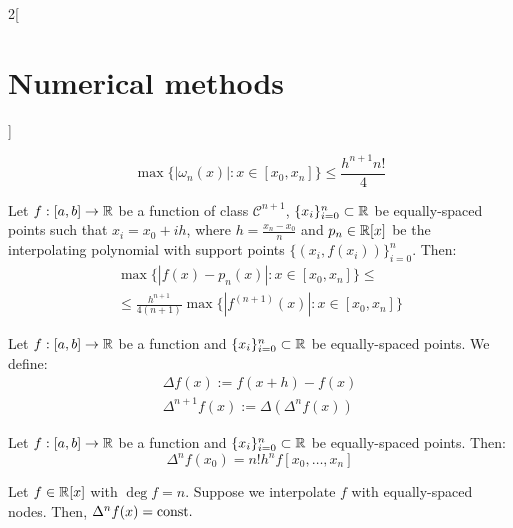 \documentclass[../../../main_math.tex]{subfiles}
\begin{document}
\begin{multicols}{2}[\section{Numerical methods}]
\begin{proposition}
    $$\max\{|\omega_n(x)|:x\in[x_0,x_n]\}\leq\frac{h^{n+1}n!}{4}$$
  \end{proposition}
  \begin{corollary}
    Let $f:[a,b]\rightarrow\mathbb{R}$ be a function of class $\mathcal{C}^{n+1}$, $\{x_i\}_{i=0}^n\subset\mathbb{R}$ be equally-spaced points such that $x_i=x_0+ih$, where $h=\frac{x_n-x_0}{n}$ and $p_n\in\mathbb{R}[x]$ be the interpolating polynomial with support points $\{(x_i,f(x_i))\}_{i=0}^n$. Then:
    \begin{multline*}
      \max\{|f(x)-p_n(x)|:x\in[x_0,x_n]\}\leq\\\leq \frac{h^{n+1}}{4(n+1)}\max\{|f^{(n+1)}(x)|:x\in[x_0,x_n]\}
    \end{multline*}
  \end{corollary}
  \begin{definition}
    Let $f:[a,b]\rightarrow\mathbb{R}$ be a function and $\{x_i\}_{i=0}^n\subset\mathbb{R}$ be equally-spaced points. We define:
    \begin{gather*}
      \Delta f(x):=f(x+h)-f(x)\\
      \Delta^{n+1}f(x):=\Delta(\Delta^nf(x))
    \end{gather*}
  \end{definition}
  \begin{lemma}
    Let $f:[a,b]\rightarrow\mathbb{R}$ be a function and $\{x_i\}_{i=0}^n\subset\mathbb{R}$ be equally-spaced points. Then: $$\Delta^nf(x_0)=n!h^nf[x_0,\ldots,x_n]$$
  \end{lemma}
  \begin{corollary}
    Let $f\in\mathbb{R}[x]$ with $\deg f=n$. Suppose we interpolate $f$ with equally-spaced nodes. Then, $\Delta^nf(x)=\text{const.}$
  \end{corollary}

\end{multicols}
\end{document}
